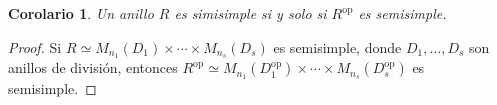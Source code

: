 \documentclass{article}
\newtheorem{corollary}{Corolario}[section]
\begin{document}
\begin{corollary}
    Un anillo $R$ es simisimple si y solo si $R^\text{op}$ es semisimple.
\end{corollary}

\begin{proof}
    Si $R \simeq M_{n_1}(D_1) \times \cdots \times M_{n_s}(D_s)$ es semisimple, donde $D_1, \dots, D_s$ son anillos de división, entonces $R^\text{op} \simeq M_{n_1}(D_1^{\text{op}}) \times \cdots \times M_{n_s}(D_s^{\text{op}})$ es semisimple.
\end{proof}
\end{document}
